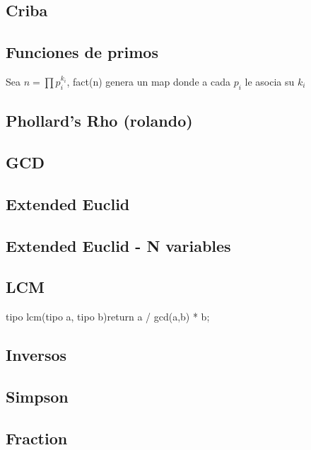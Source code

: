 \subsection{Criba}
\subsection{Funciones de primos}
Sea $n=\prod{p_i^{k_i}}$, fact(n) genera un map donde a cada $p_i$ le asocia su $k_i$
\subsection{Phollard's Rho (rolando)}
\subsection{GCD}
\subsection{Extended Euclid}

\subsection{Extended Euclid - N variables}

\subsection{LCM}
\begin{code}
tipo lcm(tipo a, tipo b){return a / gcd(a,b) * b;}
\end{code}
\subsection{Inversos}
\subsection{Simpson}
\subsection{Fraction}
